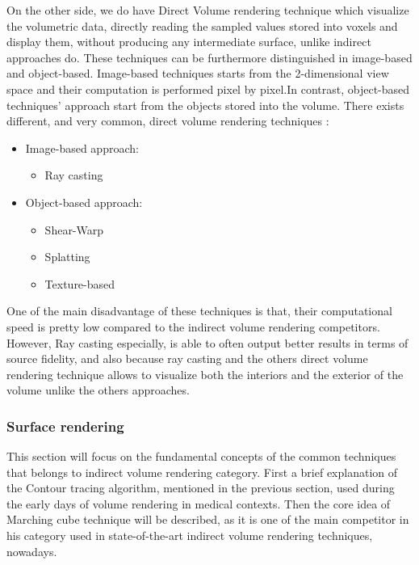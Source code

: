 \documentclass[10pt,a4paper]{article}
\begin{document}
On the other side, we do have Direct Volume rendering technique which visualize the volumetric data, directly reading the sampled values stored into voxels and display them, without producing any intermediate surface, unlike indirect approaches do. These techniques can be furthermore distinguished in image-based and object-based. Image-based techniques starts from the 2-dimensional view space and their computation is performed pixel by pixel.In contrast, object-based techniques' approach start from the objects stored into the volume. There exists different, and very common, direct volume rendering techniques :
\begin{itemize}
\item Image-based approach:
\begin{itemize}
\item Ray casting
\end{itemize}
\item Object-based approach:
\begin{itemize}
\item Shear-Warp
\item Splatting
\item Texture-based
\end{itemize}
\end{itemize}

One of the main disadvantage of these techniques is that, their computational speed is pretty low compared to the indirect volume rendering competitors. However, Ray casting especially, is able to often output better results in terms of source fidelity, and also because ray casting and the others direct volume rendering technique allows to visualize both the interiors and the exterior of the volume unlike the others approaches.

\subsubsection{Surface rendering} %
This section will focus on the fundamental concepts of the common techniques that belongs to indirect volume rendering category. First a brief explanation of the Contour tracing algorithm, mentioned in the previous section, used during the early days of volume rendering in medical contexts. Then the core idea of Marching cube technique will be described, as it is one of the main competitor in his category used in state-of-the-art indirect volume rendering techniques, nowadays.
\end{document}
